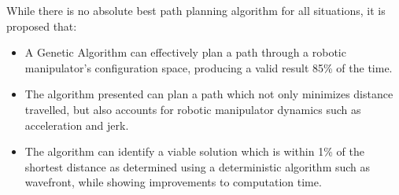 While there is no absolute best path planning algorithm for all situations, it is proposed that:
\begin{itemize}
	\item A Genetic Algorithm can effectively plan a path through a robotic manipulator's configuration space, producing a valid result 85\% of the time.
	\item The algorithm presented can plan a path which not only minimizes distance travelled, but also accounts for robotic manipulator dynamics such as acceleration and jerk.
	\item The algorithm can identify a viable solution which is within 1\% of the shortest distance as determined using a deterministic algorithm such as wavefront, while showing improvements to computation time.
\end{itemize}

